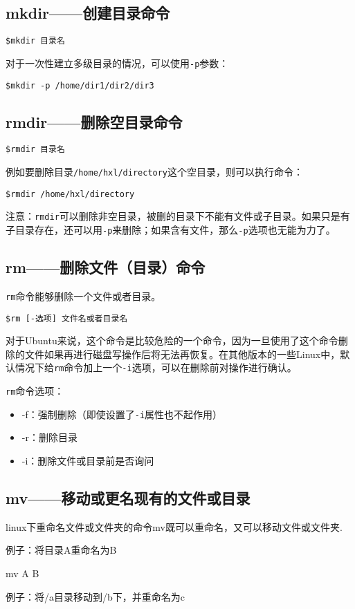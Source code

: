 \subsection{mkdir——创建目录命令}
\verb*|$mkdir 目录名|

对于一次性建立多级目录的情况，可以使用\verb*|-p|参数：

\verb*|$mkdir -p /home/dir1/dir2/dir3|


\subsection{rmdir——删除空目录命令}
\verb*|$rmdir 目录名|

例如要删除目录\verb*|/home/hxl/directory|这个空目录，则可以执行命令：

\verb*|$rmdir /home/hxl/directory|

注意：\verb*|rmdir|可以删除非空目录，被删的目录下不能有文件或子目录。如果只是有子目录存在，还可以用\verb*|-p|来删除；如果含有文件，那么\verb*|-p|选项也无能为力了。


\subsection{rm——删除文件（目录）命令}
\verb*|rm|命令能够删除一个文件或者目录。

\verb*|$rm [-选项] 文件名或者目录名|

对于Ubuntu来说，这个命令是比较危险的一个命令，因为一旦使用了这个命令删除的文件如果再进行磁盘写操作后将无法再恢复。在其他版本的一些Linux中，默认情况下给\verb*|rm|命令加上一个\verb*|-i|选项，可以在删除前对操作进行确认。

\verb*|rm|命令选项：
\begin{itemize}
\item -f：强制删除（即使设置了\verb*|-i|属性也不起作用）
\item -r：删除目录
\item -i：删除文件或目录前是否询问
\end{itemize}


\subsection{mv——移动或更名现有的文件或目录}
linux下重命名文件或文件夹的命令mv既可以重命名，又可以移动文件或文件夹.

例子：将目录A重命名为B

mv A B

例子：将/a目录移动到/b下，并重命名为c

